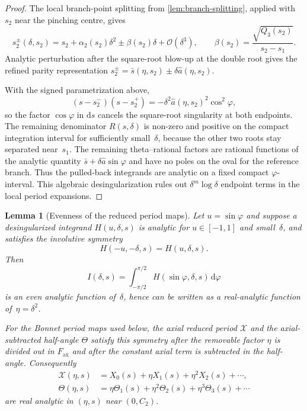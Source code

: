 \documentclass[11pt,a4paper]{article}
\theoremstyle{plain}
\newtheorem{lemma}[theorem]{Lemma}
\theoremstyle{definition}
\theoremstyle{remark}
\newcommand{\dd}{\mathrm{d}}
\newcommand{\Oo}{\mathcal{O}}
\begin{document}
\begin{proof}
  The local branch-point splitting from
  \cref{lem:branch-splitting}, applied with $s_2$ near the pinching
  centre, gives
  \[
    s_2^\pm(\delta,s_2)
    =
    s_2+\alpha_2(s_2)\delta^2
    \pm \beta(s_2)\delta+\Oo(\delta^3),
    \qquad
    \beta(s_2)=\frac{\sqrt{Q_3(s_2)}}{s_2-s_1}.
  \]
  Analytic perturbation after the square-root blow-up at the double
  root gives the refined parity representation
  $s_2^\pm=\bar s(\eta,s_2)\pm\delta\widehat a(\eta,s_2)$.

  With the signed parametrization above,
  \[
    (s-s_2^-)(s-s_2^+)
    =
    -\delta^2\widehat a(\eta,s_2)^2\cos^2\!\varphi,
  \]
  so the factor $\cos\varphi$ in $\dd s$ cancels the square-root
  singularity at both endpoints.  The remaining denominator
  $R(s,\delta)$ is non-zero and positive on the compact integration
  interval for sufficiently small~$\delta$, because the other two
  roots stay separated near~$s_1$.  The remaining theta--rational
  factors are rational functions of the analytic quantity
  $\bar s+\delta\widehat a\sin\varphi$ and have no poles on the oval
  for the reference branch.  Thus the pulled-back integrands are
  analytic on a fixed compact $\varphi$-interval.  This algebraic
  desingularization rules out $\delta^{m}\log\delta$ endpoint terms
  in the local period expansions.
\end{proof}

\begin{lemma}[Evenness of the reduced period maps]
\label{lem:reduced-period-evenness}
  Let $u=\sin\varphi$ and suppose a desingularized integrand
  $H(u,\delta,s)$ is analytic for $u\in[-1,1]$ and small~$\delta$,
  and satisfies the involutive symmetry
  \begin{equation}\label{eq:H-evenness-symmetry}
    H(-u,-\delta,s)=H(u,\delta,s).
  \end{equation}
  Then
  \[
    I(\delta,s)=\int_{-\pi/2}^{\pi/2}
      H(\sin\varphi,\delta,s)\,\dd\varphi
  \]
  is an even analytic function of~$\delta$, hence can be written as a
  real-analytic function of~$\eta=\delta^2$.

  For the Bonnet period maps used below, the axial reduced period
  $\mathcal X$ and the axial-subtracted half-angle $\Theta$ satisfy
  this symmetry after the removable factor $\eta$ is divided out in
  $F_{\mathrm{ax}}$ and after the constant axial term is subtracted in
  the half-angle.  Consequently
  \begin{align*}
    \mathcal X(\eta,s)
      &=X_0(s)+\eta X_1(s)+\eta^2X_2(s)+\cdots,\\
    \Theta(\eta,s)
      &=\eta\Theta_1(s)+\eta^2\Theta_2(s)+\eta^3\Theta_3(s)+\cdots
  \end{align*}
  are real analytic in $(\eta,s)$ near $(0,C_2)$.
\end{lemma}
\end{document}
